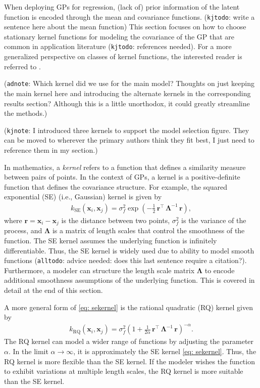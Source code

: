 \documentclass[journal=jacsat,manuscript=article]{achemso}
\newcommand{\kjnote}[1]{{\color{Blue} (\texttt{kjnote}: #1)}}
\newcommand{\kjtodo}[1]{{\color{Red} (\texttt{kjtodo}: #1)}}
\newcommand{\alltodo}[1]{{\color{Cyan} (\texttt{alltodo}: #1)}}
\newcommand{\xvec}{\ensuremath{\mathbf{x}}}
\newcommand{\adnote}[1]{{\color{OliveGreen} (\texttt{adnote}: #1)}}
\begin{document}
When deploying GPs for regression, (lack of) prior information of the latent function is encoded through the mean and covariance functions. \kjtodo{write a sentence here about the mean function} This section focuses on how to choose stationary kernel functions for modeling the covariance of the GP that are common in application literature \kjtodo{references needed}. For a more generalized perspective on classes of kernel functions, the interested reader is referred to \citeauthor{Genton} \cite{Genton}.

\adnote{Which kernel did we use for the main model? Thoughts on just keeping the main kernel here and introducing the alternate kernels in the corresponding results section? Although this is a little unorthodox, it could greatly streamline the methods.}

\kjnote{I introduced three kernels to support the model selection figure. They can be moved to wherever the primary authors think they fit best, I just need to reference them in my section.}

In mathematics, a \textit{kernel} refers to a function that defines a similarity measure between pairs of points. In the context of GPs, a kernel is a positive-definite function that defines the covariance structure. For example, the squared exponential (SE) (i.e., Gaussian) kernel is given by
\begin{gather}
     k_{\text{SE}}(\xvec_i,\xvec_j) = \sigma_f^2 \exp \left(-\frac{1}{2}\, \mathbf{r}^\intercal \,\boldsymbol{\Lambda}^{-1} \,\mathbf{r} \right), \label{eq: sekernel}
 \end{gather}
 where $\mathbf{r} = \xvec_i - \xvec_j$ is the distance between two points, $\sigma_f^2$ is the variance of the process, and $\boldsymbol{\Lambda}$ is a matrix of length scales that control the smoothness of the function. The SE kernel assumes the underlying function is infinitely differentiable. Thus, the SE kernel is widely used due to ability to model smooth functions \alltodo{advice needed: does this last sentence require a citation?}. Furthermore, a modeler can structure the length scale matrix $\boldsymbol{\Lambda}$ to encode additional smoothness assumptions of the underlying function. This is covered in detail at the end of this section. 

 A more general form of \eqref{eq: sekernel} is the rational quadratic (RQ) kernel given by
 \begin{gather}
     k_{\text{RQ}}(\xvec_i,\xvec_j) = \sigma_f^2 \left(1 +\frac{1}{2 \alpha} \,\mathbf{r}^\intercal \,\boldsymbol{\Lambda}^{-1} \,\mathbf{r} \right)^{-\alpha}. \label{eq: rationalquadkernel}
 \end{gather}
 The RQ kernel can model a wider range of functions by adjusting the parameter $\alpha$. In the limit $\alpha \rightarrow \infty$, it is approximately the SE kernel \eqref{eq: sekernel}. Thus, the RQ kernel is more flexible than the SE kernel. If the modeler wishes the function to exhibit variations at multiple length scales, the RQ kernel is more suitable than the SE kernel.
\end{document}
